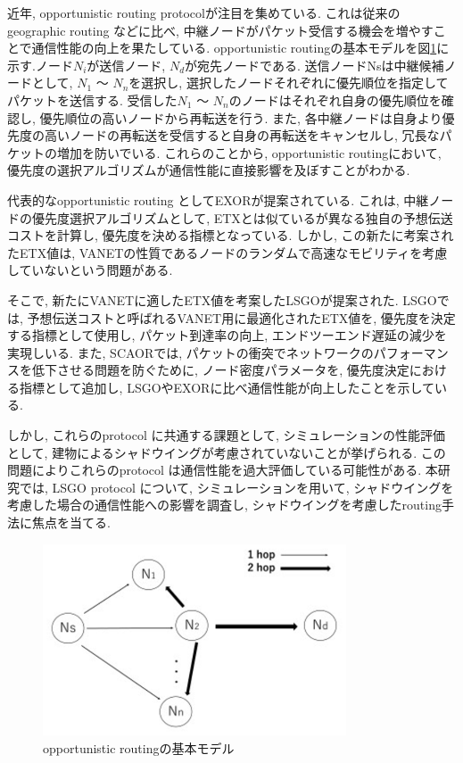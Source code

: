 \documentclass[technicalreport]{ieicej}
\begin{document}
近年, opportunistic routing protocolが注目を集めている. これは従来のgeographic routing \cite{GPSR}\cite{GPCR}などに比べ, 中継ノードがパケット受信する機会を増やすことで通信性能の向上を果たしている. opportunistic routingの基本モデルを図\ref{fig:Basic}に示す.ノード$N_{i}$が送信ノード, $N_{d}$が宛先ノードである. 送信ノードNsは中継候補ノードとして, $N_{1}$ ～ $N_{n}$を選択し, 選択したノードそれぞれに優先順位を指定してパケットを送信する. 受信した$N_{1}$ ～ $N_{n}$のノードはそれぞれ自身の優先順位を確認し, 優先順位の高いノードから再転送を行う. また, 各中継ノードは自身より優先度の高いノードの再転送を受信すると自身の再転送をキャンセルし, 冗長なパケットの増加を防いでいる. これらのことから, opportunistic routingにおいて, 優先度の選択アルゴリズムが通信性能に直接影響を及ぼすことがわかる.\par
代表的なopportunistic routing としてEXOR\cite{EXOR}が提案されている. これは, 中継ノードの優先度選択アルゴリズムとして, ETX\cite{ETX}とは似ているが異なる独自の予想伝送コストを計算し, 優先度を決める指標となっている. しかし, この新たに考案されたETX値は, VANETの性質であるノードのランダムで高速なモビリティを考慮していないという問題がある.\par
そこで, 新たにVANETに適したETX値を考案したLSGO\cite{LSGO}が提案された. LSGOでは, 予想伝送コストと呼ばれるVANET用に最適化されたETX値を, 優先度を決定する指標として使用し, パケット到達率の向上, エンドツーエンド遅延の減少を実現しいる. また, SCAOR\cite{SCAOR}では, パケットの衝突でネットワークのパフォーマンスを低下させる問題を防ぐために, ノード密度パラメータを, 優先度決定における指標として追加し, LSGOやEXORに比べ通信性能が向上したことを示している.\par
 しかし, これらのprotocol に共通する課題として, シミュレーションの性能評価として, 建物によるシャドウイングが考慮されていないことが挙げられる. この問題によりこれらのprotocol は通信性能を過大評価している可能性がある. 本研究では, LSGO protocol について, シミュレーションを用いて, シャドウイングを考慮した場合の通信性能への影響を調査し, シャドウイングを考慮したrouting手法に焦点を当てる.
 \begin{figure}[!ht]
\centering
\includegraphics[width=90mm]{figures/basic-opportunity.eps}
\caption{opportunistic routingの基本モデル}
\label{fig:Basic}
\end{figure}
\end{document}
